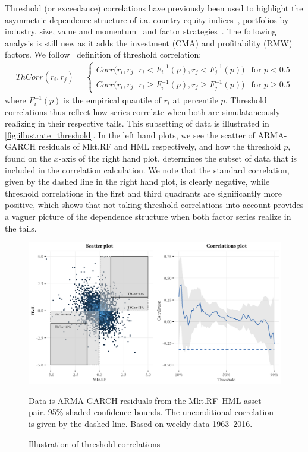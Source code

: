 Threshold (or exceedance) correlations have previously been used to highlight the asymmetric dependence structure of i.a. country equity indices~\autocite{LonginSolnik2001}, portfolios by industry, size, value and momentum~\autocite{AngChen2002} and factor strategies~\autocite{ChristoffersenLanglois2013}. The following analysis is still new as it adds the investment (CMA) and profitability (RMW) factors. We follow~\textcite{ChristoffersenLanglois2013} definition of threshold correlation:
\begin{align}
\label{eq:th_corr}
    ThCorr(r_i, r_j) = 
    \begin{cases} 
        Corr\Big(r_i, r_j \,|\, r_i < F_i^{-1}(p), r_j < F_j^{-1}(p)\Big)  & \text{for } p < 0.5 \\
        Corr\Big(r_i, r_j \,|\, r_i \geq F_i^{-1}(p), r_j \geq F_j^{-1}(p)\Big)  & \text{for } p \geq 0.5
    \end{cases}
\end{align}
where $F_i^{-1}(p)$ is the empirical quantile of $r_i$ at percentile $p$. Threshold correlations thus reflect how series correlate when both are simulataneously realizing in their respective tails. This subsetting of data is illustrated in \autoref{fig:illustrate_threshold}. In the left hand plots, we see the scatter of ARMA-GARCH residuals of Mkt.RF and HML respectively, and how the threshold $p$, found on the $x$-axis of the right hand plot, determines the subset of data that is included in the correlation calculation. We note that the standard correlation, given by the dashed line in the right hand plot, is clearly negative, while threshold correlations in the first and third quadrants are significantly more positive, which shows that not taking threshold correlations into account provides a vaguer picture of the dependence structure when both factor series realize in the tails.

\begin{figure}[H]
  \centering
  \includegraphics[scale=1]{graphics/threshold_explain_res.png}
  \footnotesize
  \caption{Illustration of threshold correlations}
  \begin{longcaption}
    Data is ARMA-GARCH residuals from the Mkt.RF--HML asset pair. 95\% shaded confidence bounds. The unconditional correlation is given by the dashed line. Based on weekly data 1963--2016.
  \end{longcaption}
  \label{fig:illustrate_threshold}
\end{figure}

